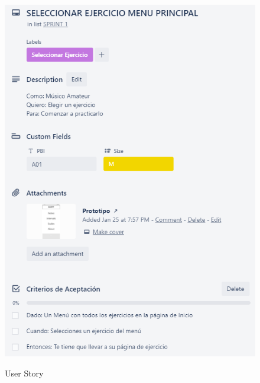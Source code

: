 \documentclass[12pt,twoside,titlepage]{report}
\begin{document}
{\begin{figure}[H]
    \centering
    \includegraphics[scale=1.3]{Scrum/User Stories/MenuMain}
    \label{fig:MenuMain}
    \caption{User Story}
\end{figure}

}
\end{document}
